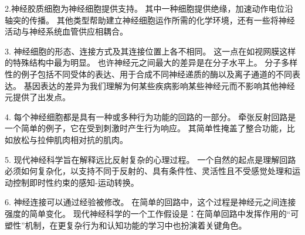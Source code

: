 2.神经胶质细胞为神经细胞提供支持。
其中一种细胞提供绝缘，加速动作电位沿轴突的传播。
其他类型帮助建立神经细胞运作所需的化学环境，还有一些将神经活动与神经系统血管供应相耦合。


3. 神经细胞的形态、连接方式及其连接位置上各不相同。 
这一点在如视网膜这样的特殊结构中最为明显。 
也许神经元之间最大的差异是在分子水平上。 
分子多样性的例子包括不同受体的表达、用于合成不同神经递质的酶以及离子通道的不同表达。 
基因表达的差异为我们理解为何某些疾病影响某些神经元而不影响其他神经元提供了出发点。


4. 每个神经细胞都是具有一种或多种行为功能的回路的一部分。
牵张反射回路是一个简单的例子，它在受到刺激时产生行为响应。
其简单性掩盖了整合功能，比如放松与拉伸肌肉相对抗的肌肉。


5. 现代神经科学旨在解释远比反射复杂的心理过程。 
一个自然的起点是理解回路必须如何复杂化，以支持不同于反射的、具有条件性、灵活性且不受感觉处理和运动控制即时性约束的感知-运动转换。


6. 神经连接可以通过经验被修改。
在简单的回路中，这个过程是神经元之间连接强度的简单变化。 
现代神经科学的一个工作假设是：在简单回路中发挥作用的“可塑性”机制，在更复杂行为和认知功能的学习中也扮演着关键角色。


%












